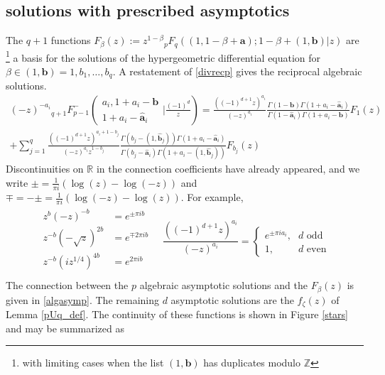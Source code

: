 \documentclass[12pt]{article}
\newcommand{\ee}[0] {e}
\newcommand{\ii}[0] {i}
\numberwithin{equation}{section}
\newcommand{\FFe}[7] {{}_{#1}^{\,}{#2}_{#3}^{#4} \left( \begin{array}{c} #5 \\ #6 \end{array} \Big| #7 \right)}
\newcommand{\bfa}[0] {\mathbf{a}}
\newcommand{\bfb}[0] {\mathbf{b}}
\begin{document}
\subsection{solutions with prescribed asymptotics}
The $q+1$ functions $F_{\beta}(z) := z^{1-\beta} {}_p F_q ( (1,1-\beta+\mathbf{a}); 1-\beta+(1,\mathbf{b}) | z)$ are \footnote{with limiting cases when the list $(1,\bfb)$ has duplicates modulo $\mathbb{Z}$} a basis for the solutions of the hypergeometric differential equation for $\beta \in (1,\bfb) = 1,b_1,\dots,b_q$. A restatement of \eqref{divrecp} gives the reciprocal algebraic solutions.
\begin{equation}
\label{algasymp}
\begin{aligned}
(-z)^{-a_i} \FFe{q+1}{F}{p-1}{-}{a_i,1+a_i-\mathbf{b}}{1+a_i-\hat{\mathbf{a}}_i}{\frac{(-1)^d}{z}} = \frac{((-1)^{d+1}z)^{a_i}}{(-z)^{a_i}}\frac{\Gamma(1-\mathbf{b})\Gamma(1+a_i-\hat{\bfa}_i)}{\Gamma(1-\hat{\bfa}_i) \Gamma(1+a_i-\bfb)} F_{1}(z)\\
+\sum_{j=1}^{q} \frac{((-1)^{d+1} z)^{a_i+1-b_j}}{(-z)^{a_i} z^{1-b_j}} \frac{\Gamma(b_j-(1,\hat{\bfb}_j)) \Gamma(1+a_i-\hat{\bfa}_i)}{\Gamma(b_j-\hat{\bfa}_i)\Gamma(1+a_i-(1,\hat{\bfb}_j))} F_{b_j}(z)
\end{aligned}
\end{equation}
Discontinuities on $\mathbb{R}$ in the connection coefficients have already appeared, and we write $\pm = \tfrac{1}{\pi \ii}(\log(z)-\log(-z))$ and $\mp = - \pm = \tfrac{1}{\pi \ii}(\log(-z)-\log(z))$. For example,
\begin{equation*}
\begin{array}{cc}
\begin{aligned}
z^b (-z)^{-b} &= \ee^{\pm \pi \ii b}\\
z^{-b} (-\sqrt{z})^{2b} &= \ee^{\mp 2 \pi \ii b}\\
z^{-b} (\ii z^{1/4})^{4b} &= \ee^{2 \pi \ii b}\\
\end{aligned}
\quad
\dfrac{((-1)^{d+1}z)^{a_i}}{(-z)^{a_i}} =
\begin{cases}
\ee^{\pm \pi \ii a_i}\text{,} & d \text{ odd}\\
1\text{,} & d \text{ even}
\end{cases}
\end{array}
\end{equation*}
The connection between the $p$ algebraic asymptotic solutions and the $F_{\beta}(z)$ is given in \eqref{algasymp}. The remaining $d$ asymptotic solutions are the $f_{\zeta}(z)$ of Lemma \ref{pUq_def}. The continuity of these functions is shown in Figure \ref{stars} and may be summarized as
\end{document}
